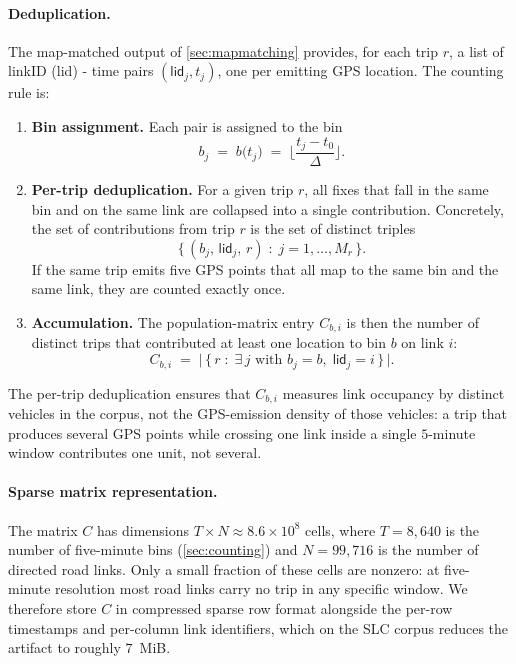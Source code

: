 \documentclass[sigconf, review]{acmart}
\begin{document}
\paragraph{Deduplication.}
The map-matched output of \cref{sec:mapmatching} provides, for
each trip $r$, a list of linkID (\textsf{lid}) - time pairs $(\textsf{lid}_j, t_j)$, one per
emitting GPS location. The counting rule is:

\begin{enumerate}[leftmargin=2.0em]
  \item \textbf{Bin assignment.} Each pair is assigned to the bin
\[
          b_j \;=\; b\!\big(t_j\big)
              \;=\; \Big\lfloor \frac{t_j - t_0}{\Delta} \Big\rfloor.
\]
  \item \textbf{Per-trip deduplication.} For a given trip $r$, all
        fixes that fall in the same bin and on the same link are
        collapsed into a single contribution. Concretely, the set
        of contributions from trip $r$ is the set of distinct
        triples
\[
          \big\{\,(b_j,\, \textsf{lid}_j,\, r) \;:\; j = 1, \ldots, M_r \,\big\}.
\]
    If the same trip emits five GPS points that all map to the same
        bin and the same link, they are counted exactly
        once.
  \item \textbf{Accumulation.} The population-matrix entry $C_{b, i}$ is then the number of distinct trips that contributed at least one location to bin $b$ on link $i$:
    \begin{equation}
    \label{eq:count-rule}
        C_{b, i} \;=\; \big|\,\{\, r \;:\;
        \exists\, j \text{ with } b_j = b,\;
        \textsf{lid}_j = i \,\}\,\big|.
    \end{equation}
\end{enumerate}

The per-trip deduplication ensures that $C_{b, i}$ measures link
occupancy by distinct vehicles in the corpus, not the GPS-emission
density of those vehicles: a trip that produces several GPS points while
crossing one link inside a single $5$-minute window contributes one
unit, not several.  

\paragraph{Sparse matrix representation.}
The matrix $C$ has dimensions $T \times N \approx 8.6 \times 10^8$
cells, where $T = 8{,}640$ is the number of five-minute bins
(\cref{sec:counting}) and $N = 99{,}716$ is the number
of directed road links. Only a small fraction of these cells are
nonzero: at five-minute resolution most road links carry no trip
in any specific window. We therefore store $C$ in
compressed sparse row format alongside the per-row timestamps and
per-column link identifiers, which on the SLC corpus reduces the
artifact to roughly $7$~MiB.
\end{document}
